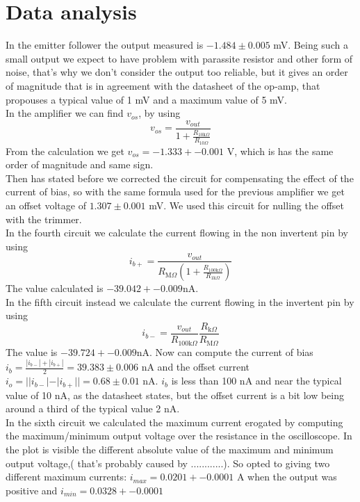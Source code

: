 \section{Data analysis}
In the emitter follower the output measured is $-1.484 \pm 0.005$ mV. Being such a small output we expect to have problem with parassite resistor and other form of  noise, that's why we don't consider the output too reliable, but it gives an order of magnitude that is in agreement with the datasheet of the op-amp, that propouses a typical value of 1 mV and a maximum value of 5 mV.\\
In the amplifier we can find $v_{os}$, by using $$v_{os} = \frac{v_{out}}{1 + \frac{R_{10\text{k}\Omega}}{R_{10\Omega}}}$$ From the calculation we get $v_{os} = -1.333 +- 0.001$ V, which is has the same order of magnitude and same sign.\\
Then has stated before we corrected the circuit for compensating the effect of the current of bias, so with the same formula used for the previous amplifier we get an offset voltage of $1.307 \pm 0.001$ mV. We used this circuit for nulling the offset with the trimmer.\\
In the fourth circuit we calculate the current flowing in the non invertent pin by using $$i_{b+} = \frac{v_{out}}{R_{\text{M}\Omega} (1 + \frac{R_{100\text{k}\Omega}}{R_{1\text{k}\Omega}})}$$ The value calculated is $-39.042 +- 0.009$nA.\\
In the fifth circuit instead we calculate the current flowing in the invertent pin by using $$i_{b-} = \frac{v_{out}}{R_{100\text{k}\Omega}} \frac{R_{\text{k}\Omega}}{R_{\text{M}\Omega}}$$ The value is $-39.724 +- 0.009$nA. Now can compute the current of bias $i_b = \frac{|i_{b-}| + |i_{b+}|}{2} = 39.383 \pm 0.006$ nA and the offset current $i_o = ||i_{b-}| - |i_{b+}|| = 0.68 \pm 0.01$ nA. $i_b$ is less than 100 nA and near the typical value of 10 nA, as the datasheet states, but the offset current is a bit low being around a third of the typical value 2 nA.\\
In the sixth circuit we calculated the maximum current erogated by computing the maximum/minimum output voltage over the resistance in the oscilloscope. In the plot is visible the different absolute value of the maximum and minimum output voltage,( that's probably caused by ............). So opted to giving two different maximum currents: $i_{max} = 0.0201 +- 0.0001$ A when the output was positive and $i_{min} = 0.0328 +- 0.0001$